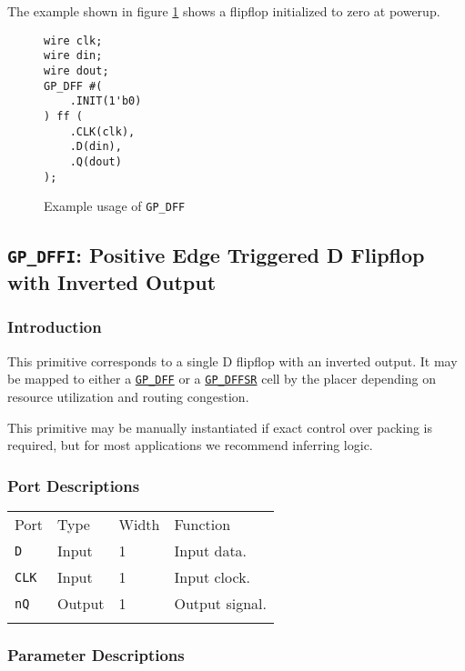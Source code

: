 \documentclass[11pt]{article}
\newcommand{\tokenstyle}[1]{\texttt{#1}}
\newcommand{\whenstyle}[1]{{\fontseries{sb}\selectfont#1}}
\newcommand{\tokenref}[2]{\hyperref[#2]{\tokenstyle{#1}}}
\newcommand{\thinhline}{\Xhline{1\arrayrulewidth}}
\newcommand{\thickhline}{\Xhline{2.5\arrayrulewidth}}
\begin{document}
The example shown in figure \ref{gp-dff-example} shows a flipflop initialized to zero at powerup.

\begin{figure}[h]
\begin{lstlisting}
wire clk;
wire din;
wire dout;
GP_DFF #(
	.INIT(1'b0)
) ff (
	.CLK(clk),
	.D(din),
	.Q(dout)
);
\end{lstlisting}
\caption{Example usage of \tokenstyle{GP\_DFF}}
\label{gp-dff-example}
\end{figure}


\pagebreak
\subsection{\tokenstyle{GP\_DFFI}: Positive Edge Triggered D Flipflop with Inverted Output}
\label{gp-dff}

\subsubsection{Introduction}
This primitive corresponds to a single D flipflop with an inverted output. It may be mapped to either a
\tokenref{GP\_DFF}{gp-dff} or a \tokenref{GP\_DFFSR}{gp-dffsr} cell by the placer depending on resource utilization and
routing congestion.

This primitive may be manually instantiated if exact control over packing is required, but for most applications we
recommend inferring logic.

\subsubsection{Port Descriptions}

\begin{tabularx}{\textwidth}{lllX}
\thinhline
\whenstyle{Port} & \whenstyle{Type} & \whenstyle{Width} & \whenstyle{Function} \\
\thickhline
\tokenstyle{D} & Input & 1 & Input data. \\
\thinhline
\tokenstyle{CLK} & Input & 1 & Input clock. \\
\thinhline
\tokenstyle{nQ} & Output & 1 & Output signal. \\
\thinhline
\end{tabularx}

\subsubsection{Parameter Descriptions}
\end{document}
